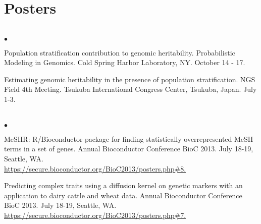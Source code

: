 \documentclass[margin,line,10pt]{res}
\newenvironment{list2}{
  \begin{list}{$\bullet$}{%
      \setlength{\itemsep}{0in}
      \setlength{\parsep}{0in} \setlength{\parskip}{0in}
      \setlength{\topsep}{0in} \setlength{\partopsep}{0in} 
      \setlength{\leftmargin}{0.2in}}}{\end{list}}
\begin{document}
\begin{resume}
\section{ \sc Posters }
\vspace{0.5cm}
\section{}
\begin{list2}

\item Population stratification contribution to genomic heritability. Probabilistic Modeling in Genomics. Cold Spring Harbor Laboratory, NY. October 14 - 17. 

  \vspace{0.5cm}
  
\item Estimating genomic heritability in the presence of population stratification. NGS Field 4th Meeting. Tsukuba International Congress Center, Tsukuba, Japan. July 1-3. 
\end{list2}

\section{}
\begin{list2}
\item   MeSHR: R/Bioconductor package for finding statistically overrepresented  MeSH terms in a set of genes. Annual Bioconductor Conference BioC 2013. July 18-19, Seattle, WA. \\ \textcolor{blue}{\href{https://secure.bioconductor.org/BioC2013/posters.php\#7}{https://secure.bioconductor.org/BioC2013/posters.php\#8. } }  

\vspace{0.5cm}

\item Predicting complex traits using a diffusion kernel on genetic markers with an application to dairy cattle and wheat data. Annual Bioconductor Conference BioC 2013. July 18-19, Seattle, WA. \textcolor{blue}{\href{https://secure.bioconductor.org/BioC2013/posters.php\#7}{https://secure.bioconductor.org/BioC2013/posters.php\#7. } }  
\end{list2}












\end{resume}
\end{document}
